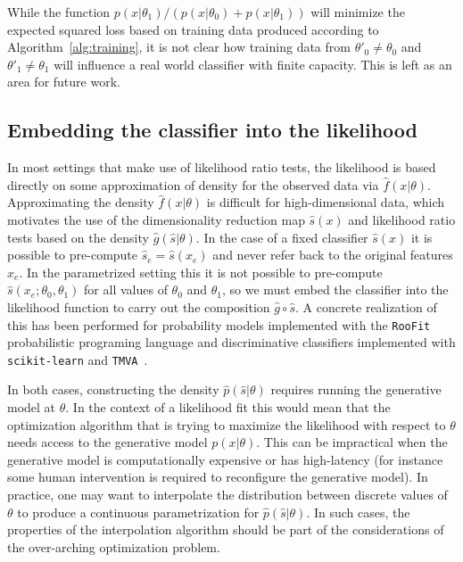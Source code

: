 \documentclass[11pt, oneside]{article}   	%
\begin{document}
While the function $p(x|\theta_1)/(p(x|\theta_0)+p(x|\theta_1))$ will minimize the expected squared loss based on 
training data produced according to Algorithm~\ref{alg:training}, it is not clear how training data from $\theta'_0 \ne \theta_0$ and $\theta'_1 \ne \theta_1$ will influence a real world classifier with finite capacity. This is left as an area for future work.

\subsection{Embedding the classifier into the likelihood}

In most settings that make use of likelihood ratio tests, the likelihood is based directly on some approximation of density for the observed data via $\hat{f}(x|\theta)$.  Approximating the density $\hat{f}(x|\theta)$ is difficult for high-dimensional data, which motivates the use of the dimensionality reduction map $\hat{s}(x)$ and likelihood ratio tests based on the density $\hat{g}(\hat{s}|\theta)$.  In the case of a fixed classifier $\hat s(x)$ it is possible to pre-compute $\hat s_e=\hat s(x_e)$ and never refer back to the original features $x_e$. In the parametrized setting this it is not possible to pre-compute $\hat s(x_e; \theta_0, \theta_1)$ for all values of $\theta_0$ and $\theta_1$, so  we must embed the classifier into the likelihood function to carry out the composition $\hat{g}\circ \hat{s}$. A concrete realization of this has been performed for probability models implemented with the \texttt{RooFit} probabilistic programing language and discriminative classifiers implemented with \texttt{scikit-learn} and \texttt{TMVA}~\citep{Verkerke:2003ir,scikit-learn,Hocker:2007ht}.

In both cases, constructing the density $\hat p(\hat s|\theta)$ requires running the generative model at $\theta$. In the context of a likelihood fit this would mean that the optimization algorithm that is trying to maximize the likelihood with respect to $\theta$ needs access to the generative model $p(x|\theta)$. This can be  impractical when the generative model is computationally expensive or has high-latency (for instance some human intervention is required to reconfigure the generative model).  In practice, one may want to interpolate the distribution between discrete values of $\theta$ to produce a continuous parametrization for $\hat p(\hat s | \theta)$. In such cases, the properties of the interpolation algorithm should be part of the considerations of the over-arching optimization problem.
\end{document}
